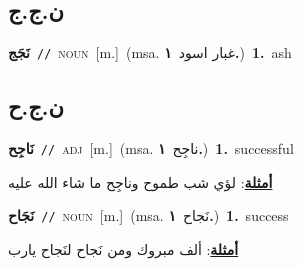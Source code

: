 \documentclass[10pt,a4paper,twoside]{article} %
\begin{document}
\begin{multicols}{2}
\vspace{-3mm}
\subsection*{\color{blue}\foreignlanguage{arabic}{ن.ج.ج}\color{blue}{}} 

{\setlength\topsep{0pt}\textbf{\foreignlanguage{arabic}{نَجَج}}\ {\color{gray}\texttt{//}\color{black}}\ \textsc{noun}\ [m.]\ \color{gray}(msa. \foreignlanguage{arabic}{غبار اسود}~\foreignlanguage{arabic}{\textbf{١.}})\color{black}\ \textbf{1.}~ash\ } \vspace{2mm}

\vspace{-3mm}
\subsection*{\color{blue}\foreignlanguage{arabic}{ن.ج.ح}\color{blue}{}} 

{\setlength\topsep{0pt}\textbf{\foreignlanguage{arabic}{نَاجِح}}\ {\color{gray}\texttt{//}\color{black}}\ \textsc{adj}\ [m.]\ \color{gray}(msa. \foreignlanguage{arabic}{ناجِح}~\foreignlanguage{arabic}{\textbf{١.}})\color{black}\ \textbf{1.}~successful\  \begin{flushright}\color{gray}\foreignlanguage{arabic}{\textbf{\underline{\foreignlanguage{arabic}{أمثلة}}}: لؤي شب طموح وناجِح ما شاء الله عليه}\end{flushright}\color{black}} \vspace{2mm}

{\setlength\topsep{0pt}\textbf{\foreignlanguage{arabic}{نَجَاح}}\ {\color{gray}\texttt{//}\color{black}}\ \textsc{noun}\ [m.]\ \color{gray}(msa. \foreignlanguage{arabic}{نَجاح}~\foreignlanguage{arabic}{\textbf{١.}})\color{black}\ \textbf{1.}~success\  \begin{flushright}\color{gray}\foreignlanguage{arabic}{\textbf{\underline{\foreignlanguage{arabic}{أمثلة}}}: ألف مبروك ومن نَجاح لنَجاح يارب}\end{flushright}\color{black}} \vspace{2mm}


\end{multicols}
\end{document}
